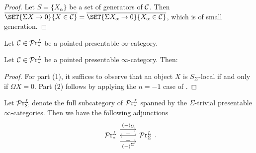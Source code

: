 \documentclass[10pt,a4paper,oneside]{article}
\begin{document}
\begin{proof}
Let $S=\{ X_\alpha\}$ be a set of generators of $\mathcal{C}$. Then $\overline{\SET{\Sigma X\to 0}{X\in\mcc}}=\overline{\SET{\Sigma X_{\alpha}\to 0}{X_{\alpha}\in\mcc}}$, which is of small generation.
\end{proof}

\begin{de}
Let $\mathcal{C}\in\mathcal{P}\mathrm{r}^L_{*}$ be a pointed presentable $\infty$-category.
\end{de}

\begin{prop}\label{sigmacore}
Let $\mathcal{C}\in\mathcal{P}\mathrm{r}^L_{*}$ be a pointed presentable $\infty$-category. 
Then:
\end{prop}

\begin{proof}
For part (1), it suffices to observe that an object $X$ is $S_\Sigma$-local if and only if $\Omega X=0$. Part (2) follows by applying the $n=-1$ case of \cite[Lemma 5.5.6.14]{htt}.
\end{proof}

\begin{prop}
Let $\mathcal{P}\mathrm{r}^L_{\Sigma}$ denote the full subcategory of $\mathcal{P}\mathrm{r}^L_{*}$ spanned by the $\Sigma$-trivial presentable $\infty$-categories. Then we have the following adjunctions
$$\begin{tikzcd}
\prl_{*} \arrow[r, "(-)_{\Sigma}", shift left=2ex] \arrow[r, "(-)^{\Sigma}"', shift right=2ex]  & \arrow[l,"\perp","\perp"', hook'] \prl_{\Sigma}
\end{tikzcd}  .$$
\end{prop}
\end{document}
